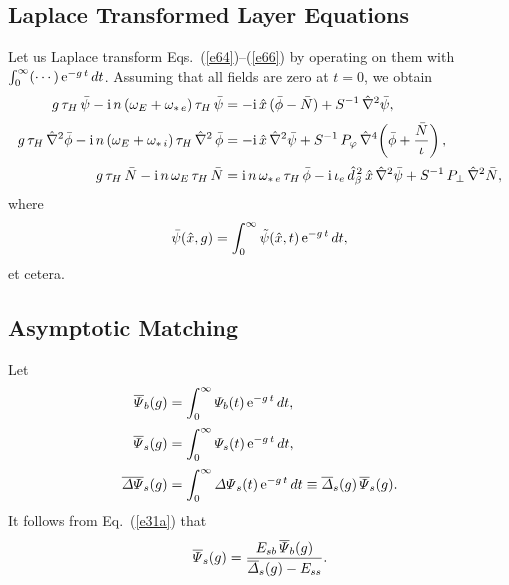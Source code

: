 \documentclass[12pt,prb,aps]{revtex4-1}
\begin{document}
\subsection{Laplace Transformed Layer Equations}
Let us Laplace transform Eqs.~(\ref{e64})--(\ref{e66}) by operating on them with
$\int_0^\infty (\cdots)\,{\rm e}^{-g\,t}\,dt$. Assuming that all fields are zero at $t=0$, we obtain
\begin{align}\label{e67}
g\,\tau_H\,\bar{\psi}-{\rm i}\,n\,(\omega_E +\omega_{\ast\,e})\,\tau_H\,\bar{\psi} &= -{\rm i} \,\hat{x}\,(\bar{\phi}-\bar{N})+ S^{-1}\,\hat{\nabla}^2\bar{\psi},\\[0.5ex]
g\,\tau_H\,\hat{\nabla}^2\bar{\phi}-{\rm i}\,n\,(\omega_E+\omega_{\ast\,i})\,\tau_H\,\hat{\nabla}^2\,\bar{\phi} &= -{\rm i}\,\hat{x}\,\hat{\nabla}^2\bar{\psi}+S^{-1}\,P_\varphi\,\hat{\nabla}^4\!\left(\bar{\phi} + \frac{\bar{N}}{\iota}\right),\\[0.5ex]
g\,\tau_H\,\bar{N}-{\rm i}\,n\,\omega_E\,\tau_H\,\bar{N} &= {\rm i}\,n\,\omega_{\ast\,e}\,\tau_H\,\bar{\phi} - {\rm i}\,\iota_e\,\hat{d}_\beta^{\,2}\,\hat{x}\,\hat{\nabla}^2\bar{\psi}+ S^{-1}\,P_\perp\,\hat{\nabla}^2 \bar{N},\label{e69}
\end{align}
where
\begin{equation}
\bar{\psi}(\hat{x},g) = \int_0^\infty \tilde{\psi}(\hat{x},t)\,{\rm e}^{-g\,t}\,dt,
\end{equation}
et cetera. 

\subsection{Asymptotic Matching}
Let
\begin{align}
\overline{\mit\Psi}_b(g) &= \int_0^\infty {\mit\Psi}_b(t)\,{\rm e}^{-g\,t}\,dt,\label{e71}\\[0.5ex]
\overline{\mit\Psi}_s(g) &= \int_0^\infty {\mit\Psi}_s(t)\,{\rm e}^{-g\,t}\,dt,\\[0.5ex]
\overline{\mit\Delta\Psi}_s(g) &= \int_0^\infty {\mit\Delta\Psi}_s(t)\,{\rm e}^{-g\,t}\,dt \equiv \overline{\mit\Delta}_s(g)\,\overline{\mit\Psi}_s(g).\label{e73a}
\end{align}
It follows from Eq.~(\ref{e31a}) that
\begin{equation}\label{e74}
\overline{\mit\Psi}_s(g) =\frac{ E_{sb}\,\overline{\mit\Psi}_b(g)}{\overline{\mit\Delta}_s(g)-E_{ss}}.
\end{equation}
\end{document}
